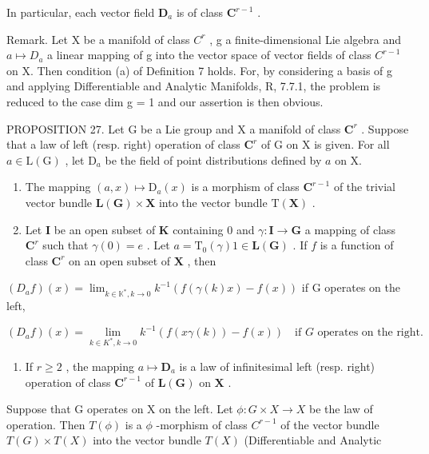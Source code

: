 In particular, each vector field \(\mathbf{D}_a\) is of class \(\mathbf{C}^{r - 1}\) .

Remark. Let X be a manifold of class \(C^{r}\) , g a finite-dimensional Lie algebra and \(a \mapsto D_{a}\) a linear mapping of g into the vector space of vector fields of class \(C^{r-1}\) on X. Then condition (a) of Definition 7 holds. For, by considering a basis of g and applying Differentiable and Analytic Manifolds, R, 7.7.1, the problem is reduced to the case dim g = 1 and our assertion is then obvious.

PROPOSITION 27. Let G be a Lie group and X a manifold of class \(\mathbf{C}^r\) . Suppose that a law of left (resp. right) operation of class \(\mathbf{C}^r\) of G on X is given. For all \(a \in \mathrm{L}(\mathrm{G})\) , let \(\mathrm{D}_a\) be the field of point distributions defined by \(a\) on X.

\begin{enumerate}
\def\labelenumi{(\roman{enumi})}
\item
  The mapping \((a, x) \mapsto \mathrm{D}_a(x)\) is a morphism of class \(\mathbf{C}^{r-1}\) of the trivial vector bundle \(\mathbf{L}(\mathbf{G}) \times \mathbf{X}\) into the vector bundle \(\mathrm{T}(\mathbf{X})\) .
\item
  Let \(\mathbf{I}\) be an open subset of \(\mathbf{K}\) containing 0 and \(\gamma: \mathbf{I} \to \mathbf{G}\) a mapping of class \(\mathbf{C}^r\) such that \(\gamma(0) = e\) . Let \(a = \mathrm{T}_0(\gamma) 1 \in \mathbf{L}(\mathbf{G})\) . If \(f\) is a function of class \(\mathbf{C}^r\) on an open subset of \(\mathbf{X}\) , then
\end{enumerate}

\((D_{a}f)(x) = \lim_{k\in \mathbb{K}^{*},k\to 0}k^{-1}(f(\gamma (k)x) - f(x))\) if G operates on the left,

\[
(D _ {a} f) (x) = \lim _ {k \in K ^ {*}, k \rightarrow 0} k ^ {- 1} (f (x \gamma (k)) - f (x)) \quad \text {if } G \text { operates on the right}.
\]

\begin{enumerate}
\def\labelenumi{(\roman{enumi})}
\setcounter{enumi}{2}
\tightlist
\item
  If \(r \geqslant 2\) , the mapping \(a \mapsto \mathbf{D}_a\) is a law of infinitesimal left (resp. right) operation of class \(\mathbf{C}^{r-1}\) of \(\mathbf{L}(\mathbf{G})\) on \(\mathbf{X}\) .
\end{enumerate}

Suppose that G operates on X on the left. Let \(\phi: G \times X \to X\) be the law of operation. Then \(T(\phi)\) is a \(\phi\) -morphism of class \(C^{r-1}\) of the vector bundle \(T(G) \times T(X)\) into the vector bundle \(T(X)\) (Differentiable and Analytic

